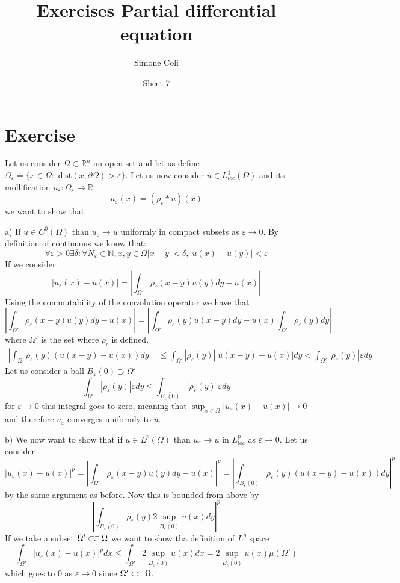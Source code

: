 \documentclass{article}
\title{Exercises \- Partial differential equation}
\author{Simone Coli \- 6771371}
\date{Sheet 7}
\newcommand{\R}{\mathbb{R}}
\newcommand{\N}{\mathbb{N}}
\newcommand{\ssubset}{\subset\joinrel\subset}
\newcommand{\dist}{\text{ dist}}
\begin{document}
\maketitle

\section{Exercise}
Let us consider $\Omega \subset \R^n$ an open set and let us define $\Omega_\varepsilon \doteq \{ x \in \Omega : \dist(x, \partial \Omega) > \varepsilon\}$. Let us now consider $u \in L_{loc}^1(\Omega)$ and its mollification $u_\varepsilon : \Omega_\varepsilon \to \R$
\[
    u_\varepsilon (x) = (\rho_\varepsilon * u)(x)
\]
we want to show that

a) If $u \in C^0(\Omega)$ than $u_\varepsilon \to u$ uniformly in compact subsets as $\varepsilon \to 0$. By definition of continuous we know that:
\[
    \forall \varepsilon >0 \exists \delta : \forall N_\varepsilon \in \N, x,y \in \Omega |x-y| < \delta, | u(x)-u(y) | < \varepsilon
\]
If we consider
\[
    | u_\varepsilon(x) - u(x)| = \left|\int_{\Omega'} \rho_\varepsilon(x-y) u(y) dy - u(x)\right| 
\]
Using the commutability of the convolution operator we have that 
\[
    \left|\int_{\Omega'} \rho_\varepsilon(x-y) u(y) dy - u(x)\right| = \left|\int_{\Omega'} \rho_\varepsilon(y) u(x-y) dy - u(x) \int_{\Omega'} \rho_\varepsilon(y) dy\right| 
\]
where  $\Omega'$ is the set where $\rho_\epsilon$ is defined.
\[
    \begin{split}
        \left|\int_{\Omega'} \rho_\varepsilon(y) (u(x-y) -u(x)) dy \right| & \leq \int_{\Omega'} |\rho_\varepsilon(y)| |u(x-y) -u(x)| dy < \int_{\Omega'} |\rho_\varepsilon(y)| \varepsilon dy 
    \end{split}   
\]
Let us consider a ball $\overline{B_\varepsilon (0)} \supset \Omega'$
\[
    \int_{\Omega'} |\rho_\varepsilon(y)| \varepsilon dy \leq \int_{\overline{B_\varepsilon(0)}} |\rho_\varepsilon(y)| \varepsilon dy 
\]
for $\varepsilon \to 0$ this integral goes to zero, meaning that $\sup_{x \in \Omega} |u_\varepsilon (x)- u(x)| \to 0$ and therefore $u_\varepsilon$ converges uniformly to $u$.

b) We now want to show that if $u \in L^p(\Omega)$ than $u_\varepsilon \to u$ in $L_{loc}^p$ as $\varepsilon \to 0$. Let us consider
\[
    | u_\varepsilon(x) - u(x)|^p = \left|\int_{\Omega'} \rho_\varepsilon(x-y) u(y) dy - u(x)\right|^p = \left|\int_{\overline{B_\varepsilon(0)}} \rho_\varepsilon(y) (u(x-y) -u(x)) dy\right|^p
\]
by the same argument as before. Now this is bounded from above by
\[
    \left|\int_{\overline{B_\varepsilon(0)}} \rho_\varepsilon(y) 2\sup_{\overline{B_\varepsilon(0)}}{u(x)} dy\right|^p
\]
If we take a subset $\Omega' \ssubset \Omega$ we want to show tha definition of $L^p$ space
\[
    \int_{\Omega'} |u_\varepsilon(x) - u(x)|^p dx \leq \int_{\Omega'} 2\sup_{\overline{B_\varepsilon(0)}}{u(x)} dx = 2\sup_{\overline{B_\varepsilon(0)}}{u(x)} \mu(\Omega')
\]
which goes to $0$ as $\varepsilon \to 0$ since $\Omega' \ssubset \Omega$.
\end{document}
